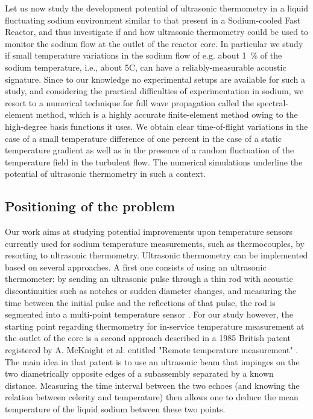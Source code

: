 Let us now study the development potential of ultrasonic thermometry in a liquid fluctuating sodium environment similar to that present in a Sodium-cooled Fast
Reactor, and thus investigate if and how ultrasonic thermometry could be used to monitor the sodium flow at the outlet of the reactor core. In particular we
study if small temperature variations in the sodium flow of e.g. about \SI{1}{\percent} of the sodium temperature, i.e., about 5\textdegree{}C, can have a
reliably-measurable acoustic signature. Since to our knowledge no experimental setups are available for such a study, and considering the practical
difficulties of experimentation in sodium, we resort to a numerical technique for full wave propagation called the spectral-element method, which is a highly
accurate finite-element method owing to the high-degree basis functions it uses. We obtain clear time-of-flight variations in the case of a small temperature
difference of one percent in the case of a static temperature gradient as well as in the presence of a random fluctuation of the temperature field in the
turbulent flow. The numerical simulations underline the potential of ultrasonic thermometry in such a context.

    \subsection{Positioning of the problem}

        Our work aims at studying potential improvements upon temperature sensors currently used for sodium temperature measurements, such as thermocouples, by resorting to
ultrasonic thermometry. Ultrasonic thermometry can be implemented based on several approaches. A first one consists of using an ultrasonic thermometer: by
sending an ultrasonic pulse through a thin rod with acoustic discontinuities such as notches or sudden diameter changes, and measuring the time between the
initial pulse and the reflections of that pulse, the rod is segmented into a multi-point temperature sensor \parencite{Daw2002Ultrasonicthermometryfor}. For
our study however, the starting point regarding thermometry for in-service temperature measurement at the outlet of the core is a second approach described in
a 1985 British patent registered by A. McKnight et al. entitled "Remote temperature measurement" \parencite{McKnight1987Remotetemperaturemeasurement}. The
main idea in that patent is to use an ultrasonic beam that impinges on the two diametrically opposite edges of a subassembly separated by a known distance.
Measuring the time interval between the two echoes (and knowing the relation between celerity and temperature) then allows one to deduce the mean temperature
of the liquid sodium between these two points.

